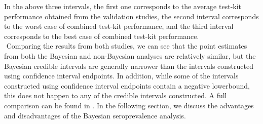 In the above three intervals, the first one corresponds to the average test-kit performance obtained from the validation studies, the second interval corresponds to the worst case of combined test-kit performance, and the third interval corresponds to the best case of combined test-kit performance.\\
\newline$ $
Comparing the results from both studies, we can see that the point estimates from both the Bayesian and non-Bayesian analyses are relatively similar, but the Bayesian credible intervals are generally narrower than the intervals constructed using confidence interval endpoints. In addition, while some of the intervals constructed using confidence interval endpoints contain a negative lowerbound, this does not happen to any of the credible intervals constructed. A full comparison can be found in \cite{meyer2022adjusting}. In the following section, we discuss the advantages and disadvantages of the Bayesian seroprevalence analysis.